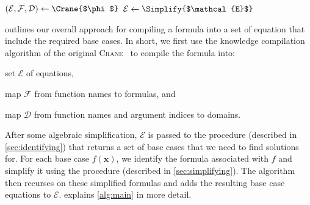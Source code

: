 \documentclass{article}
\theoremstyle{definition}
\begin{document}
\begin{algorithm}[t]
  \caption{\protect\CompileWithBaseCases{$\phi$}}\label{alg:main}
  $(\mathcal{E}, \mathcal{F}, \mathcal{D}) \gets \Crane{$\phi$}$\;\label{line:first}
  $\mathcal{E} \gets \Simplify{$\mathcal{E}$}$\;\label{line:second}
\end{algorithm}

 outlines our overall approach for compiling a formula into a set
of equation that include the required base cases. In short, we first use the
knowledge compilation algorithm of the original
\textsc{Crane}~\cite{DBLP:conf/kr/DilkasB23} to compile the formula into:
\begin{enumerate*}[label=(\roman*)]
  \item set $\mathcal{E}$ of equations,
  \item map $\mathcal{F}$ from function names to formulas, and
  \item map $\mathcal{D}$ from function names and argument indices to domains.
\end{enumerate*}
After some algebraic simplification, $\mathcal{E}$ is passed to the
\FindBaseCases procedure (described in \cref{sec:identifying}) that returns a
set of base cases that we need to find solutions for. For each base case
$f(\mathbf{x})$, we identify the formula associated with $f$ and simplify it
using the \Propagate procedure (described in \cref{sec:simplifying}). The
algorithm then recurses on these simplified formulas and adds the resulting base
case equations to $\mathcal{E}$.  explains \cref{alg:main}
in more detail.
\end{document}
